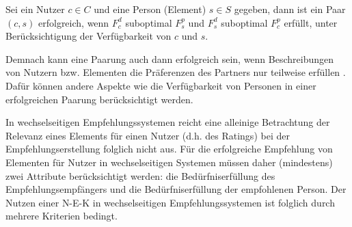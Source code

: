 \begin{definition}\label{def:2}
    Sei ein Nutzer $c \in C$ und eine Person (Element) $s \in S$ gegeben, dann ist ein Paar $(c,s)$ erfolgreich, wenn $F_{c}^{d}$ suboptimal $F_{s}^{p}$ und $F_{s}^{d}$ suboptimal $F_{c}^{p}$ erfüllt, unter Berücksichtigung der Verfügbarkeit von $c$ und $s$.
\end{definition}

Demnach kann eine Paarung auch dann erfolgreich sein, wenn Beschreibungen von Nutzern bzw. Elementen die Präferenzen des Partners nur teilweise erfüllen \cite[S. 37]{li:inproceedings}.
Dafür können andere Aspekte wie die Verfügbarkeit von Personen in einer erfolgreichen Paarung berücksichtigt werden.


In wechselseitigen Empfehlungssystemen reicht eine alleinige Betrachtung der Relevanz eines Elements für einen Nutzer (d.h. des Ratings) bei der Empfehlungserstellung folglich nicht aus.
Für die erfolgreiche Empfehlung von Elementen für Nutzer in wechselseitigen Systemen müssen daher (mindestens) zwei Attribute berücksichtigt werden: die Bedürfniserfüllung des Empfehlungsempfängers und die Bedürfniserfüllung der empfohlenen Person.
Der Nutzen einer \ac{N-E-K} in wechselseitigen Empfehlungssystemen ist folglich durch mehrere Kriterien bedingt.

